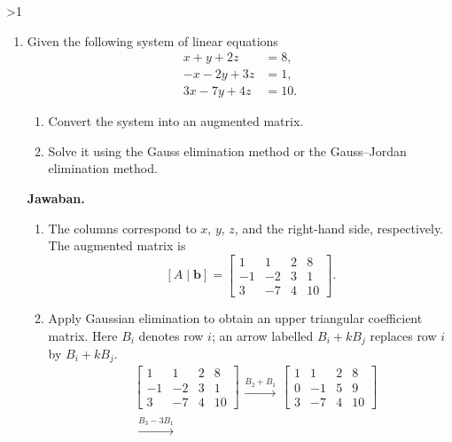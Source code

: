 \documentclass[12pt]{article}
\newcommand{\answername}{Jawaban}
\newenvironment{soaljawab}[1]{%
    \ifnum#1>1\clearpage\fi
    \begin{tcolorbox}[enhanced,breakable,height fill,height fixed for=all,
        sharp corners,colback=white,colframe=black,boxrule=0.4bp,
        boxsep=0pt,left=12bp,right=12bp,top=6bp,bottom=10bp,
        before skip=0pt,after skip=0pt,pad at break=8bp]
    \fontsize{12bp}{14bp}\selectfont
    \setlength{\abovedisplayskip}{8bp}
    \setlength{\belowdisplayskip}{8bp}
    \setlength{\abovedisplayshortskip}{8bp}
    \setlength{\belowdisplayshortskip}{8bp}
    \renewcommand{\arraystretch}{1.15}
    \begin{enumerate}[start=#1,topsep=0pt]
}{%
    \end{enumerate}
    \end{tcolorbox}
}
\newcommand{\jawaban}{\par\medskip\textbf{\answername.}\par\smallskip}
\begin{document}
\begin{soaljawab}{5}
\item Given the following system of linear equations
        \[
          \begin{aligned}
            x + y + 2z   & = 8,  \\
            -x - 2y + 3z & = 1,  \\
            3x - 7y + 4z & = 10.
          \end{aligned}
        \]
        \begin{enumerate}
          \item Convert the system into an augmented matrix.
          \item Solve it using the Gauss elimination method or the Gauss--Jordan elimination method.
        \end{enumerate}
\jawaban
\begin{enumerate}
\item The columns correspond to $x$, $y$, $z$, and the right-hand side, respectively.
The augmented matrix is
\[
    [A\mid\mathbf b] = \left[\begin{array}{ccc|c}
            1 & 1 & 2 & 8 \\
            -1 & -2 & 3 & 1 \\
            3 & -7 & 4 & 10
        \end{array}\right].
\]
\item Apply Gaussian elimination to obtain an upper triangular coefficient matrix.
Here $B_i$ denotes row $i$; an arrow labelled $B_i+kB_j$ replaces row $i$
by $B_i+kB_j$.
{\setlength{\arraycolsep}{4bp}
\begin{align*}
    & \left[\begin{array}{ccc|c}
            1 & 1 & 2 & 8 \\
            -1 & -2 & 3 & 1 \\
            3 & -7 & 4 & 10
        \end{array}\right]
        \begin{array}{c}\xrightarrow{B_2+B_1}\end{array}
        \left[\begin{array}{ccc|c}
            1 & 1 & 2 & 8 \\
            0 & -1 & 5 & 9 \\
            3 & -7 & 4 & 10
        \end{array}\right] \\[6bp]
    & \begin{array}{c}\xrightarrow{B_3-3B_1}\end{array}

\end{align*}}
\end{enumerate}
\end{soaljawab}
\end{document}
